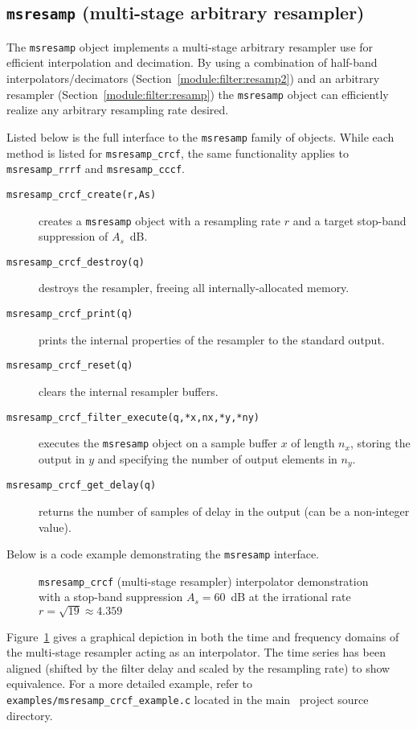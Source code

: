 % 
%
\subsection{{\tt msresamp} (multi-stage arbitrary resampler)}
\label{module:filter:msresamp}
The {\tt msresamp} object implements a multi-stage arbitrary resampler
use for efficient interpolation and decimation.
By using a combination of half-band interpolators/decimators
(Section~\ref{module:filter:resamp2})
and an arbitrary resampler (Section~\ref{module:filter:resamp})
the {\tt msresamp} object can
efficiently realize any arbitrary resampling rate desired.

Listed below is the full interface to the {\tt msresamp} family of
objects.
While each method is listed for {\tt msresamp\_crcf}, the same
functionality applies to {\tt msresamp\_rrrf} and {\tt msresamp\_cccf}.
%
\begin{description}
\item[{\tt msresamp\_crcf\_create(r,As)}]
    creates a {\tt msresamp} object with a resampling rate $r$
    and a target stop-band suppression of $A_s$~dB.
\item[{\tt msresamp\_crcf\_destroy(q)}]
    destroys the resampler, freeing all internally-allocated memory.
\item[{\tt msresamp\_crcf\_print(q)}]
    prints the internal properties of the resampler to the standard
    output.
\item[{\tt msresamp\_crcf\_reset(q)}]
    clears the internal resampler buffers.
\item[{\tt msresamp\_crcf\_filter\_execute(q,*x,nx,*y,*ny)}]
    executes the {\tt msresamp} object on a sample buffer $x$ of length
    $n_x$, storing the output in $y$ and specifying the number of output
    elements in $n_y$.
\item[{\tt msresamp\_crcf\_get\_delay(q)}]
    returns the number of samples of delay in the output
    (can be a non-integer value).
\end{description}
%
Below is a code example demonstrating the {\tt msresamp} interface.
%

%
\begin{figure}
\centering
{}
\caption{{\tt msresamp\_crcf} (multi-stage resampler) interpolator
         demonstration with a stop-band suppression $A_s=60$~dB
         at the irrational rate $r = \sqrt{19} \approx 4.359$}
\label{fig:module:filter:msresamp_crcf}
\end{figure}
%
Figure~\ref{fig:module:filter:msresamp_crcf} gives a graphical depiction
in both the time and frequency domains
of the multi-stage resampler acting as an interpolator.
The time series has been aligned (shifted by the filter delay and scaled by
the resampling rate) to show equivalence.
%
For a more detailed example, refer to
{\tt examples/msresamp\_crcf\_example.c}
located in the main \liquid\ project source directory.


